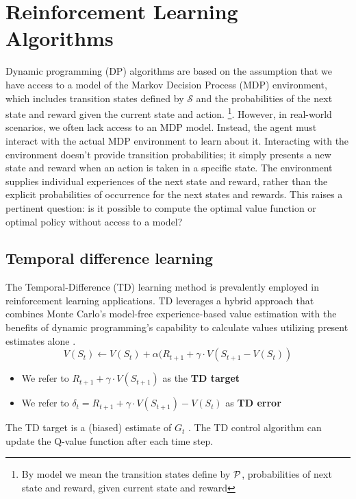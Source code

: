 \section{Reinforcement Learning Algorithms}
Dynamic programming (DP) algorithms are based on the assumption that we have access to a model of the Markov Decision Process (MDP) environment, which includes transition states defined by $\mathcal{S}$ and the probabilities of the next state and reward given the current state and action. \footnote{By model we mean the transition states define by $\mathcal P$, probabilities of next state and reward, given current state and reward}.
However, in real-world scenarios, we often lack access to an MDP model. Instead, the agent must interact with the actual MDP environment to learn about it. Interacting with the environment doesn't provide transition probabilities; it simply presents a new state and reward when an action is taken in a specific state. The environment supplies individual experiences of the next state and reward, rather than the explicit probabilities of occurrence for the next states and rewards. This raises a pertinent question: is it possible to compute the optimal value function or optimal policy without access to a model?


\subsection{Temporal difference learning}
The Temporal-Difference (TD) learning method is prevalently employed in reinforcement learning applications. TD leverages a hybrid approach that combines Monte Carlo's model-free experience-based value estimation with the benefits of dynamic programming's capability to calculate values utilizing present estimates alone \cite{sutton1988b}. 
\begin{equation}
    V(S_t) \leftarrow V(S_t) + \alpha(R_{t+1} + \gamma \cdot V(S_{t+1} - V(S_t))
\end{equation}
\begin{itemize}
    \item We refer to $R_{t+1} + \gamma \cdot V(S_{t+1})$ as the \textbf{TD target}
    \item We refer to $\delta_{t} = R_{t+1} + \gamma \cdot V(S_{t+1}) - V(S_{t})$ as  \textbf{TD error}
\end{itemize}
The TD target is a (biased) estimate of $G_t$ \cite{RL}. The TD control algorithm can update the Q-value function after each time step. 



